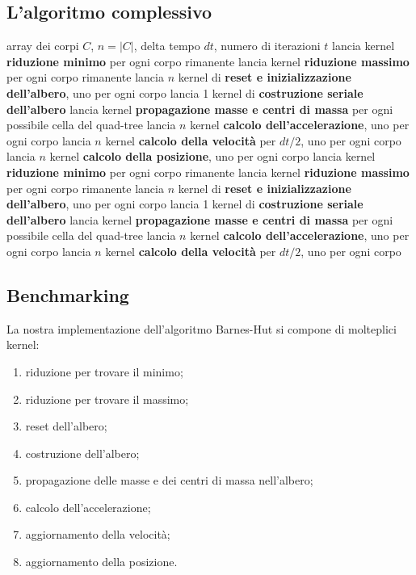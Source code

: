 \documentclass{article}
\begin{document}
\subsection{L'algoritmo complessivo}
\begin{algorithm}[htp]
	\caption{Simulazione $n$-body Barnes-Hut}
	\begin{algorithmic}[1]
		\Require array dei corpi $C$, $n = |C|$, delta tempo $dt$, numero di  iterazioni $t$
		\State lancia kernel \textbf{riduzione minimo} per ogni corpo rimanente
		\EndFor
	\State lancia kernel \textbf{riduzione massimo} per ogni corpo rimanente
	\EndFor
	\State lancia $n$ kernel di \textbf{reset e inizializzazione dell'albero}, uno per ogni corpo
	\State lancia 1 kernel di \textbf{costruzione seriale dell'albero}
	\State lancia kernel \textbf{propagazione masse e centri di massa} per ogni possibile cella del quad-tree
	\EndFor
	\State lancia $n$ kernel \textbf{calcolo dell'accelerazione}, uno per ogni corpo 
	\State lancia $n$ kernel \textbf{calcolo della velocità} per $dt/2$, uno per ogni corpo 
	\State lancia $n$ kernel \textbf{calcolo della posizione}, uno per ogni corpo 
	\State lancia kernel \textbf{riduzione minimo} per ogni corpo rimanente
	\EndFor
	\State lancia kernel \textbf{riduzione massimo} per ogni corpo rimanente
	\EndFor
	\State lancia $n$ kernel di \textbf{reset e inizializzazione dell'albero}, uno per ogni corpo
	\State lancia 1 kernel di \textbf{costruzione seriale dell'albero}
	\State lancia kernel \textbf{propagazione masse e centri di massa} per ogni possibile cella del quad-tree
	\EndFor
	\State lancia $n$ kernel \textbf{calcolo dell'accelerazione}, uno per ogni corpo 
	\State lancia $n$ kernel \textbf{calcolo della velocità} per $dt/2$, uno per ogni corpo 
	\EndFor
	\end{algorithmic}
\end{algorithm}

\newpage
\subsection{Benchmarking}
La nostra implementazione dell'algoritmo Barnes-Hut si compone di molteplici kernel:
\begin{enumerate}
	\item riduzione per trovare il minimo;
	\item riduzione per trovare il massimo;
	\item reset dell'albero;
	\item costruzione dell'albero;
	\item propagazione delle masse e dei centri di massa nell'albero;
	\item calcolo dell'accelerazione;
	\item aggiornamento della velocità;
	\item aggiornamento della posizione.
\end{enumerate}
\end{document}
